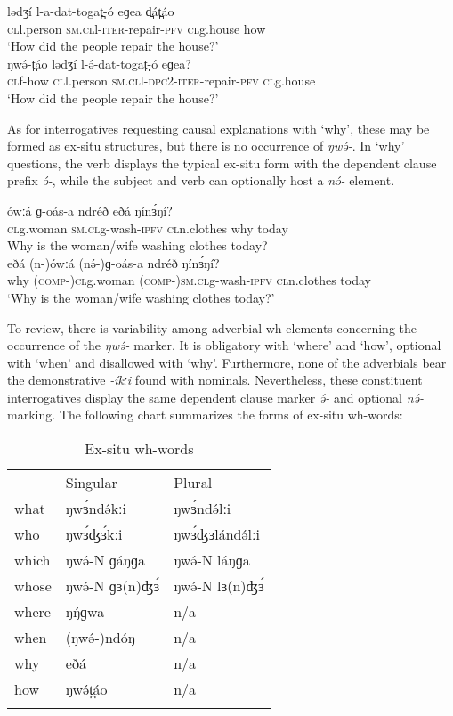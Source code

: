\ea
\ea \gll		lədʒí	l-a-dat-togat̪-ó	eɡea	d̪át̪áo  \\
	\textsc{cl}l.person	\textsc{sm.cl}l-\textsc{iter}-repair-\textsc{pfv}	\textsc{cl}g.house	how  \\
\trans	‘How did the people repair the house?’\\
\ex \gll	 ŋwə́-t̪áo	lədʒí	l-ə́-dat-togat̪-ó	eɡea?\\
	\textsc{cl}f-how	\textsc{cl}l.person	\textsc{sm.cl}l-\textsc{dpc}2-\textsc{iter}-repair-\textsc{pfv}	\textsc{cl}g.house\\
\trans	‘How did the people repair the house?’\\
\z
\z

As for interrogatives requesting causal explanations with ‘why’, these may be formed as ex-situ structures, but there is no occurrence of \textit{ŋwə́-}. In ‘why’ questions, the verb displays the typical ex-situ form with the dependent clause prefix \textit{ə́-}, while the subject and verb can optionally host a \textit{nə́-} element.

\ea
\ea \gll	ówːá	ɡ-oás-a	ndréð	eðá	ŋínɜ́ŋí?\\
	\textsc{cl}g.woman	\textsc{sm.cl}g-wash-\textsc{ipfv}	\textsc{cl}n.clothes	why	today\\
\trans		Why is the woman/wife washing clothes today?\\
\ex \gll	eðá	(n-)ówːá	(nə́-)ɡ-oás-a	ndréð	ŋínɜ́ŋí?\\
	why	(\textsc{comp-})\textsc{cl}g.woman	(\textsc{comp-})\textsc{sm.cl}g-wash-\textsc{ipfv}	\textsc{cl}n.clothes	today\\
\trans		‘Why is the woman/wife washing clothes today?’\\
\z
\z

To review, there is variability among adverbial wh-elements concerning the occurrence of the \textit{ŋwə́-} marker. It is obligatory with ‘where’ and ‘how’, optional with ‘when’ and disallowed with ‘why’. Furthermore, none of the adverbials bear the demonstrative \textit{-íkːi} found with nominals. Nevertheless, these constituent interrogatives display the same dependent clause marker \textit{ə́-} and optional \textit{nə́-} marking. The following chart summarizes the forms of ex-situ wh-words: 

\begin{table}
	\caption{Ex-situ wh-words}
	\label{Ch19:2}
	\begin{tabular}[t]{lll}
	\lsptoprule
&	Singular	&	Plural\\
what	&	ŋwɜ́ndə́kːi	&	ŋwɜ́ndə́lːi\\
who	&	ŋwɜ́ʤɜ́kːi	&	ŋwɜ́ʤɜlándə́lːi\\
which	&	ŋwə́-N  ɡáŋɡa	&	ŋwə́-N láŋɡa\\
whose	&	ŋwə́-N  ɡɜ(n)ʤɜ́	&	ŋwə́-N lɜ(n)ʤɜ́\\
where	&	ŋŋ́ɡwa	&	n/a\\
when	&	(ŋwə́-)ndóŋ	&	n/a\\
why	&	eðá	&	n/a\\
how	&	ŋwə́t̪áo	&	n/a\\
	\lspbottomrule
	\end{tabular}
\end{table}

